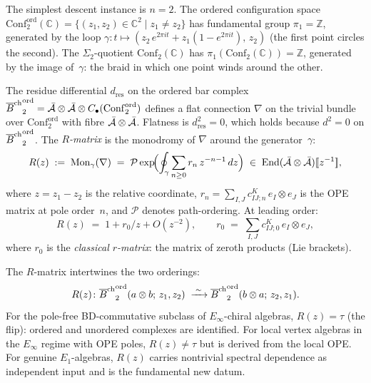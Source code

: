 \begin{construction}
\label{constr:r-matrix-monodromy}
The simplest descent instance is $n=2$. The ordered
configuration space
$\mathrm{Conf}_2^{\mathrm{ord}}(\mathbb C)
=\{(z_1,z_2)\in\mathbb C^2\mid z_1\neq z_2\}$
has fundamental group $\pi_1=\mathbb Z$, generated by the
loop $\gamma\colon t\mapsto
(z_2\,e^{2\pi it}+z_1(1-e^{2\pi it}),\,z_2)$
(the first point circles the second). The $\Sigma_2$-quotient
$\mathrm{Conf}_2(\mathbb C)$ has
$\pi_1(\mathrm{Conf}_2(\mathbb C))=\mathbb Z$, generated by
the image of~$\gamma$: the braid in which one point
winds around the other.

The residue differential $d_{\mathrm{res}}$ on the ordered
bar complex
${\overline{B}^{\mathrm{ch}}}_2^{\mathrm{ord}}=\bar{\mathcal{A}}\otimes\bar{\mathcal{A}}\otimes
C_\bullet(\mathrm{Conf}_2^{\mathrm{ord}})$
defines a flat connection $\nabla$ on the trivial bundle
over $\mathrm{Conf}_2^{\mathrm{ord}}$ with fibre
$\bar{\mathcal{A}}\otimes\bar{\mathcal{A}}$. Flatness is $d_{\mathrm{res}}^2=0$,
which holds because $d^2=0$ on ${\overline{B}^{\mathrm{ch}}}_2^{\mathrm{ord}}$.
The \emph{$R$-matrix} is the monodromy of $\nabla$ around
the generator~$\gamma$:
\begin{equation}\label{eq:r-matrix-monodromy}
R(z)
\;:=\;
\operatorname{Mon}_\gamma(\nabla)
\;=\;
\mathcal P\exp\!\Bigl(
\oint_\gamma\sum_{n\ge 0}r_n\,z^{-n-1}\,dz
\Bigr)
\;\in\;
\operatorname{End}(\bar{\mathcal{A}}\otimes\bar{\mathcal{A}})[\![z^{-1}]\!],
\end{equation}
where $z=z_1-z_2$ is the relative coordinate,
$r_n=\sum_{I,J}c^K_{IJ;n}\,e_I\otimes e_J$ is the OPE matrix
at pole order~$n$, and $\mathcal P$ denotes path-ordering.
At leading order:
\begin{equation}\label{eq:r-matrix-leading}
R(z)\;=\;1+r_0/z+O(z^{-2}),
\qquad
r_0\;=\;\sum_{I,J}c^K_{IJ;0}\,e_I\otimes e_J,
\end{equation}
where $r_0$ is the \emph{classical $r$-matrix}: the matrix
of zeroth products (Lie brackets).

The $R$-matrix intertwines the two orderings:
\[
R(z)\colon
{\overline{B}^{\mathrm{ch}}}_2^{\mathrm{ord}}(a\otimes b;\,z_1,z_2)
\;\xrightarrow{\;\sim\;}
{\overline{B}^{\mathrm{ch}}}_2^{\mathrm{ord}}(b\otimes a;\,z_2,z_1).
\]
For the pole-free BD-commutative subclass of
$E_\infty$-chiral algebras, $R(z)=\tau$ (the flip): ordered
and unordered complexes are identified. For local
vertex algebras in the $E_\infty$ regime with OPE poles,
$R(z)\ne\tau$ but is derived from the local OPE.
For genuine $E_1$-algebras, $R(z)$ carries nontrivial spectral
dependence as independent input and is the fundamental new datum.
\end{construction}

